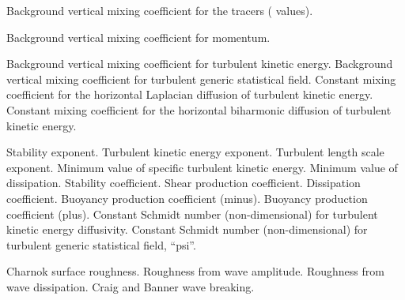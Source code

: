 \begin{klist}
    \mbox{}
     \begin{klist}
         Background vertical mixing coefficient
     for the tracers ( values).
     \end{klist}
    \mbox{}
     \begin{klist}
         Background vertical mixing coefficient 
     for momentum.
     \end{klist}
    \mbox{}
     \begin{klist}
         Background vertical mixing coefficient
     for turbulent kinetic energy.
         Background vertical mixing coefficient
     for turbulent generic statistical field.
           Constant mixing coefficient for the horizontal
     Laplacian diffusion of turbulent kinetic energy.
           Constant mixing coefficient for the horizontal
     biharmonic diffusion of turbulent kinetic energy.
     \end{klist}
   \mbox{}
     \begin{klist}
          Stability exponent.
          Turbulent kinetic energy exponent.
          Turbulent length scale exponent.
         Minimum value of specific turbulent kinetic
       energy.
         Minimum value of dissipation.
          Stability coefficient.
          Shear production coefficient.
          Dissipation coefficient.
          Buoyancy production coefficient (minus).
          Buoyancy production coefficient (plus).
        Constant Schmidt number (non-dimensional) for
       turbulent kinetic energy diffusivity.
         Constant Schmidt number (non-dimensional) for
       turbulent generic statistical field, ``psi''.
     \end{klist}
    \mbox{}
     \begin{klist}
        Charnok surface roughness.
        Roughness from wave amplitude.
        Roughness from wave dissipation.
        Craig and Banner wave breaking.
     \end{klist}

\end{klist}
